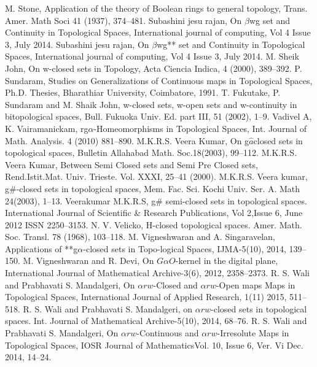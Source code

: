 \begin{thebibliography}{99}
 M. Stone, Application of the theory of Boolean rings to general topology, Trans. Amer. Math Soci  41 (1937), 374--481.
 Subashini jesu rajan, On $\beta$wg set and Continuity in Topological Spaces, International journal of computing, Vol 4 Issue 3, July 2014.
 Subashini jesu rajan, On $\beta$wg** set and Continuity in Topological Spaces, International journal of  computing, Vol 4 Issue 3, July 2014.
 M. Sheik John, On w-closed sets in Topology, Acta Ciencia Indica, 4 (2000), 389--392.
 P. Sundaram, Studies on Generalizations of Continuous maps in Topological Spaces, Ph.D. Thesies, Bharathiar University, Coimbatore, 1991.
 T. Fukutake, P. Sundaram and M. Shaik John, w-closed sets, w-open sets and w-continuity in bitopological spaces, Bull. Fukuoka Univ. Ed. part III, 51 (2002), 1--9.
 Vadivel A, K. Vairamanickam, rg$\alpha$-Homeomorphisms in Topological Spaces, Int. Journal of Math. Analysis. 4 (2010) 881--890. 
 M.K.R.S. Veera Kumar, On g$\hat{a}$closed sets in topological spaces, Bulletin Allahabad Math. Soc.18(2003),  99--112.
 M.K.R.S. Veera Kumar, Between Semi Closed sets and Semi Pre Closed sets, Rend.Istit.Mat. Univ. Trieste. Vol. XXXI, 25--41 (2000).
 M.K.R.S. Veera kumar, g\#-closed sets in topological spaces, Mem. Fac. Sci. Kochi Univ. Ser. A. Math 24(2003), 1--13. 
 Veerakumar M.K.R.S, g\# semi-closed sets in topological spaces. International Journal of Scientific \& Research Publications, Vol 2,Issue 6, June 2012 ISSN 2250--3153.
 N. V. Velicko, H-closed topological spaces. Amer. Math. Soc. Transl. 78 (1968), 103--118.
 M. Vigneshwaran and A. Singaravelan, Applications of {*}{*}g$\alpha$-closed sets in Topo-logical Spaces, IJMA-5(10), 2014, 139--150.
 M. Vigneshwaran and R. Devi, On $G \alpha O$-kernel in the digital plane, International Journal of Mathematical Archive-3(6), 2012, 2358--2373.
 R. S. Wali and Prabhavati S. Mandalgeri, On $\alpha rw$-Closed and $\alpha rw$-Open maps Maps in Topological Spaces, International Journal of Applied Research, 1(11) 2015, 511--518.
 R. S. Wali and Prabhavati S. Mandalgeri, on $\alpha rw$-closed sets in topological spaces. Int. Journal of Mathematical Archive-5(10), 2014, 68--76.
 R. S. Wali and Prabhavati S. Mandalgeri, On $\alpha rw$-Continuous and $\alpha rw$-Irresolute Maps in Topological Spaces, IOSR Journal of MathematicsVol. 10, Issue 6, Ver. Vi Dec. 2014, 14--24.
\end{thebibliography}
